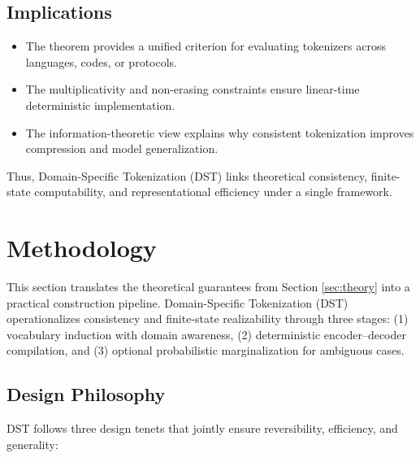 \subsection{Implications}

\begin{itemize}
\item The theorem provides a unified criterion for evaluating
tokenizers across languages, codes, or protocols.
\item The multiplicativity and non-erasing constraints ensure
linear-time deterministic implementation.
\item The information-theoretic view explains why consistent
tokenization improves compression and model generalization.
\end{itemize}

Thus, Domain-Specific Tokenization (DST)
links theoretical consistency, finite-state computability,
and representational efficiency under a single framework.


\section{Methodology}
\label{sec:method}

This section translates the theoretical guarantees from
Section \ref{sec:theory} into a practical construction pipeline.
Domain-Specific Tokenization (DST) operationalizes
consistency and finite-state realizability through three stages:
(1) vocabulary induction with domain awareness,
(2) deterministic encoder–decoder compilation,
and (3) optional probabilistic marginalization for ambiguous cases.

\subsection{Design Philosophy}
\label{sec:method-design}

DST follows three design tenets that jointly ensure
reversibility, efficiency, and generality:

